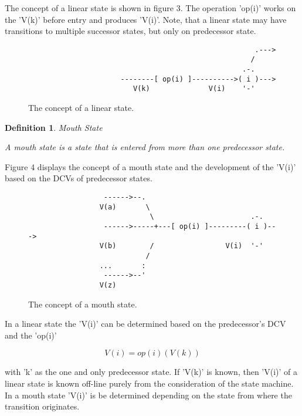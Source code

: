 \documentclass[12pt]{article}
\newtheorem{definition}{Definition}
\begin{document}
The concept of a linear state is shown in figure 3. The operation 'op(i)' works
on the 'V(k)' before entry and produces 'V(i)'. Note, that a linear state
may have transitions to multiple successor states, but only on predecessor state.

\begin{figure}[htbp] \leavevmode
\begin{verbatim}
                                                      .---> 
                                                     /
                                                   .-.
                      --------[ op(i) ]---------->( i )---> 
                         V(k)              V(i)    '-'

\end{verbatim}
\caption{The concept of a linear state.}
\end{figure}

\begin{definition}
Mouth State

A mouth state is a state that is entered from more than one predecessor 
state. 
\end{definition}
    
Figure 4 displays the concept of a mouth state and the development of the
'V(i)' based on the DCVs of predecessor states.

\begin{figure}[htbp] \leavevmode
\begin{verbatim}
                  ------>--.  
                 V(a)       \ 
                             \                       .-.
                  ------>-----+---[ op(i) ]---------( i )---> 
                 V(b)        /                 V(i)  '-'
                            /
                 ...       :
                  ------>--'
                 V(z)

\end{verbatim}
\caption{The concept of a mouth state.}
\end{figure}

In a linear state the 'V(i)' can be determined based on the predecessor's
DCV and the 'op(i)'

\[
            V(i) = op(i)(V(k))                                         
\]

with 'k' as the one and only predecessor state. If 'V(k)' is known, then
'V(i)' of a linear state is known off-line purely from the consideration of
the state machine.  In a mouth state 'V(i)' is be determined depending on the
state from where the transition originates.
\end{document}
